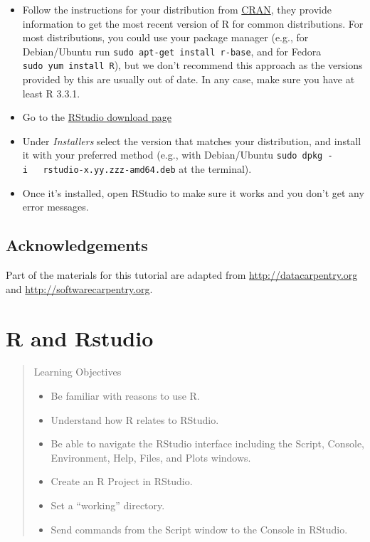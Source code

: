 \documentclass[]{book}
\providecommand{\tightlist}{%
  \setlength{\itemsep}{0pt}\setlength{\parskip}{0pt}}
\theoremstyle{definition}
\theoremstyle{definition}
\theoremstyle{remark}
\begin{document}
\begin{itemize}
\tightlist
\item
  Follow the instructions for your distribution from
  \href{https://cloud.r-project.org/bin/linux}{CRAN}, they provide
  information to get the most recent version of R for common
  distributions. For most distributions, you could use your package
  manager (e.g., for Debian/Ubuntu run
  \texttt{sudo\ apt-get\ install\ r-base}, and for Fedora
  \texttt{sudo\ yum\ install\ R}), but we don't recommend this approach
  as the versions provided by this are usually out of date. In any case,
  make sure you have at least R 3.3.1.
\item
  Go to the
  \href{https://www.rstudio.com/products/rstudio/download/\#download}{RStudio
  download page}
\item
  Under \emph{Installers} select the version that matches your
  distribution, and install it with your preferred method (e.g., with
  Debian/Ubuntu \texttt{sudo\ dpkg\ -i\ \ \ rstudio-x.yy.zzz-amd64.deb}
  at the terminal).
\item
  Once it's installed, open RStudio to make sure it works and you don't
  get any error messages.
\end{itemize}

\section*{Acknowledgements}\label{acknowledgements}

Part of the materials for this tutorial are adapted from
\url{http://datacarpentry.org} and \url{http://softwarecarpentry.org}.

\chapter{R and Rstudio}\label{backgroud}

\begin{quote}
Learning Objectives

\begin{itemize}
\tightlist
\item
  Be familiar with reasons to use R.
\item
  Understand how R relates to RStudio.
\item
  Be able to navigate the RStudio interface including the Script,
  Console, Environment, Help, Files, and Plots windows.
\item
  Create an R Project in RStudio.
\item
  Set a ``working'' directory.
\item
  Send commands from the Script window to the Console in RStudio.
\end{itemize}
\end{quote}
\end{document}
